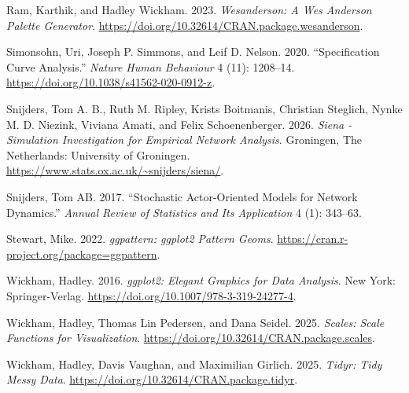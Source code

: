 \documentclass[
  letterpaper,
  DIV=11,
  numbers=noendperiod]{scrartcl}
\newlength{\cslhangindent}
\newenvironment{CSLReferences}[2] %
 {\begin{list}{}{%
  \setlength{\itemindent}{0pt}
  \setlength{\leftmargin}{0pt}
  \setlength{\parsep}{0pt}
  \ifodd #1
   \setlength{\leftmargin}{\cslhangindent}
   \setlength{\itemindent}{-1\cslhangindent}
  \fi
  \setlength{\itemsep}{#2\baselineskip}}}
 {\end{list}}
\begin{document}
\begin{CSLReferences}{1}{0}
Ram, Karthik, and Hadley Wickham. 2023. \emph{Wesanderson: A Wes
Anderson Palette Generator}.
\url{https://doi.org/10.32614/CRAN.package.wesanderson}.

Simonsohn, Uri, Joseph P. Simmons, and Leif D. Nelson. 2020.
{``Specification Curve Analysis.''} \emph{Nature Human Behaviour} 4
(11): 1208--14. \url{https://doi.org/10.1038/s41562-020-0912-z}.

Snijders, Tom A. B., Ruth M. Ripley, Krists Boitmanis, Christian
Steglich, Nynke M. D. Niezink, Viviana Amati, and Felix Schoenenberger.
2026. \emph{Siena - Simulation Investigation for Empirical Network
Analysis}. Groningen, The Netherlands: University of Groningen.
\url{https://www.stats.ox.ac.uk/~snijders/siena/}.

Snijders, Tom AB. 2017. {``Stochastic Actor-Oriented Models for Network
Dynamics.''} \emph{Annual Review of Statistics and Its Application} 4
(1): 343--63.

Stewart, Mike. 2022. \emph{{ggpattern}: {ggplot2} Pattern Geoms}.
\url{https://cran.r-project.org/package=ggpattern}.

Wickham, Hadley. 2016. \emph{{ggplot2}: Elegant Graphics for Data
Analysis}. New York: Springer-Verlag.
\url{https://doi.org/10.1007/978-3-319-24277-4}.

Wickham, Hadley, Thomas Lin Pedersen, and Dana Seidel. 2025.
\emph{Scales: Scale Functions for Visualization}.
\url{https://doi.org/10.32614/CRAN.package.scales}.

Wickham, Hadley, Davis Vaughan, and Maximilian Girlich. 2025.
\emph{Tidyr: Tidy Messy Data}.
\url{https://doi.org/10.32614/CRAN.package.tidyr}.

\end{CSLReferences}
\end{document}

